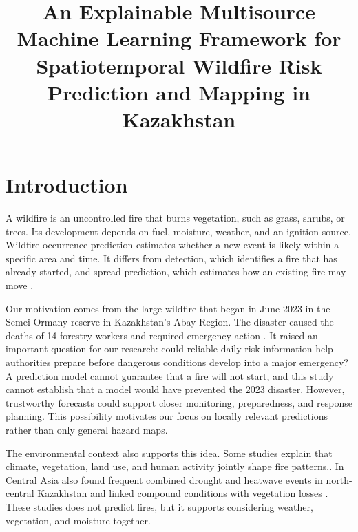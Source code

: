 \documentclass[pdflatex,sn-mathphys-num]{sn-jnl}
\begin{document}
\title[Wildfire Risk Prediction in Kazakhstan]{An Explainable Multisource Machine Learning Framework for Spatiotemporal Wildfire Risk Prediction and Mapping in Kazakhstan}

\author{ }

\author{ }


\maketitle

\section{Introduction}\label{sec:introduction}

A wildfire is an uncontrolled fire that burns vegetation, such as grass, shrubs, or trees. Its development depends on fuel, moisture, weather, and an ignition source. Wildfire occurrence prediction estimates whether a new event is likely within a specific area and time. It differs from detection, which identifies a fire that has already started, and spread prediction, which estimates how an existing fire may move \cite{xu2025deep}. 

Our motivation comes from the large wildfire that began in June 2023 in the Semei Ormany reserve in Kazakhstan's Abay Region. The disaster caused the deaths of 14 forestry workers and required emergency action \cite{sentinel2023abayfire}. It raised an important question for our research: could reliable daily risk information help authorities prepare before dangerous conditions develop into a major emergency? A prediction model cannot guarantee that a fire will not start, and this study cannot establish that a model would have prevented the 2023 disaster. However, trustworthy forecasts could support closer monitoring, preparedness, and response planning. This possibility motivates our focus on locally relevant predictions rather than only general hazard maps.

The environmental context also supports this idea. Some studies explain that climate, vegetation, land use, and human activity jointly shape fire patterns.\cite{jones2022fireclimate}. In Central Asia also found frequent combined drought and heatwave events in north-central Kazakhstan and linked compound conditions with vegetation losses \cite{ding2026vegetation}. These studies does not predict fires, but it supports considering weather, vegetation, and moisture together.
\end{document}

